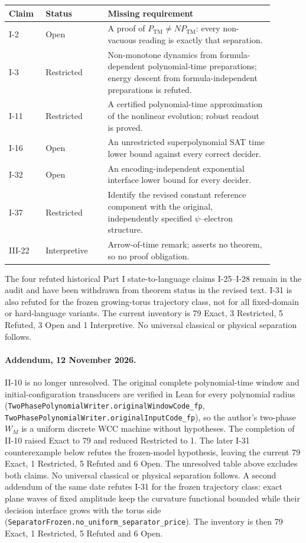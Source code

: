\documentclass[11pt]{article}
\begin{document}
\begin{center}\small
\begin{tabular}{@{}p{0.12\linewidth}p{0.21\linewidth}p{0.56\linewidth}@{}}\toprule
Claim & Status & Missing requirement\\\midrule
I-2 & Open & A proof of $P_{\mathrm{TM}}\neq NP_{\mathrm{TM}}$: every non-vacuous reading is exactly that separation.\\
I-3 & Restricted & Non-monotone dynamics from formula-dependent polynomial-time preparations; energy descent from formula-independent preparations is refuted.\\
I-11 & Restricted & A certified polynomial-time approximation of the nonlinear evolution; robust readout is proved.\\
I-16 & Open & An unrestricted superpolynomial SAT time lower bound against every correct decider.\\
I-32 & Open & An encoding-independent exponential interface lower bound for every decider.\\
I-37 & Restricted & Identify the revised constant reference component with the original, independently specified $\psi$--electron structure.\\
III-22 & Interpretive & Arrow-of-time remark; asserts no theorem, so no proof obligation.\\
\bottomrule
\end{tabular}
\end{center}
The four refuted historical Part I state-to-language
claims I-25--I-28 remain in the audit and have been
withdrawn from theorem status in the revised text.
I-31 is also refuted for the frozen growing-torus trajectory
class, not for all fixed-domain or hard-language variants.
The current inventory is 79 Exact, 3 Restricted, 5 Refuted, 3 Open and 1 Interpretive.
No universal classical or physical separation follows.

\paragraph{Addendum, 12 November 2026.}
II-10 is no longer unresolved.  The original complete
polynomial-time window and initial-configuration transducers are
verified in Lean for every polynomial radius
(\nolinkurl{TwoPhasePolynomialWriter.originalWindowCode_fp},
\nolinkurl{TwoPhasePolynomialWriter.originalInputCode_fp}), so the
author's two-phase $W_M$ is a uniform discrete WCC machine without
hypotheses.  The completion of II-10 raised Exact to 79 and reduced Restricted to 1.
The later I-31 counterexample below refutes the frozen-model hypothesis,
leaving the current 79 Exact, 1 Restricted, 5 Refuted and 6 Open.
The unresolved table above excludes both claims. No universal
classical or physical separation follows.
A second addendum of the same date refutes I-31 for the frozen
trajectory class: exact plane waves of fixed amplitude keep the
curvature functional bounded while their decision interface grows
with the torus side
(\nolinkurl{SeparatorFrozen.no_uniform_separator_price}).  The
inventory is then 79 Exact, 1 Restricted, 5 Refuted and 6 Open.
\end{document}
